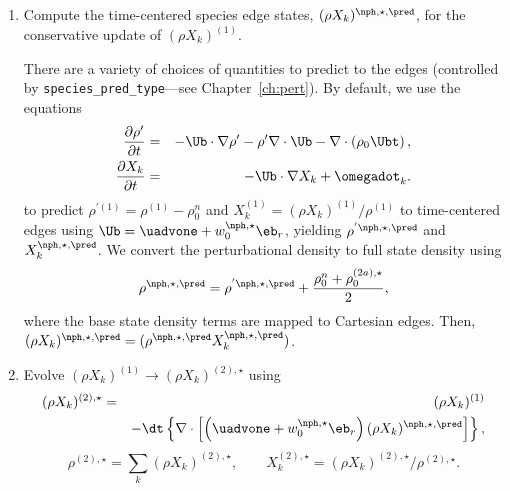 \begin{description}
\begin{enumerate}
\begin{enumerate}
\renewcommand{\labelenumii}{{\bf \roman{enumii}}.}

\item Compute the time-centered species edge states, $(\rho X_k)^{\nph,\star,\pred}$,
  for the conservative update of $(\rho X_k)^{(1)}$.  

  There are a variety of choices of quantities to predict to the
  edges (controlled by {\tt species\_pred\_type}---see Chapter~\ref{ch:pert}).
  By default, we use the equations 
\begin{eqnarray}
\frac{\partial\rho'}{\partial t} &=& -\Ub\cdot\nabla\rho' - 
     \rho'\nabla\cdot\Ub - \nabla\cdot\left(\rho_0\Ubt\right),
     \label{eq:Perturbational Density}  \\
\frac{\partial X_k}{\partial t} &=& -\Ub\cdot\nabla X_k + 
     \omegadot_k. \label{eq:Primitive Species}
\end{eqnarray}
  to
  predict $\rho^{'(1)} = \rho^{(1)} - \rho_0^n$ and 
  $X_k^{(1)} = (\rho  X_k)^{(1)} / \rho^{(1)}$ to time-centered edges using 
  $\Ub = \uadvone+w_0^{\nph,\star}\eb_r$, yielding $\rho^{'\nph,\star,\pred}$ 
  and $X_k^{\nph,\star,\pred}$.
  We convert the perturbational density to full state density using
\begin{equation}
\rho^{\nph,\star,\pred} = \rho^{'\nph,\star,\pred} + \frac{\rho_0^n + \rho_0^{(2a),\star}}{2},
\end{equation}
  where the base state density terms are mapped to Cartesian edges.
  Then,\\
  $(\rho X_k)^{\nph,\star,\pred} = (\rho^{\nph,\star,\pred}X_k^{\nph,\star,\pred})$.

\item Evolve $(\rho X_k)^{(1)} \rightarrow (\rho X_k)^{(2),\star}$ using
\begin{eqnarray}
(\rho X_k)^{(2),\star} &=& (\rho X_k)^{(1)} \nonumber \\
&& - \dt \left\{ \nabla \cdot \left[ \left(\uadvone+w_0^{\nph,\star} \eb_r\right) (\rho X_k)^{\nph,\star,\pred} \right] \right\},\nonumber \\
\end{eqnarray}
\begin{equation}
\rho^{(2),\star} = \sum_k (\rho X_k)^{(2),\star},
\qquad
X_k^{(2),\star} = (\rho X_k)^{(2),\star} / \rho^{(2),\star}.
\end{equation}

\end{enumerate}


\end{enumerate}
\end{description}
